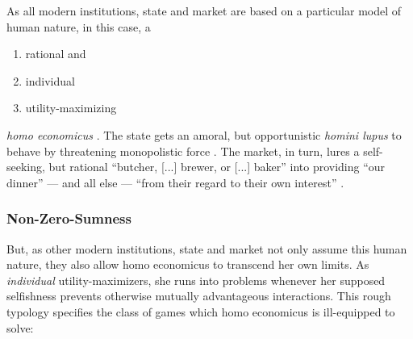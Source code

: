 As all modern institutions, state and market are based on a particular model of human nature, in this case, a
\begin{enumerate}
	\item rational and %
	\item individual
	\item utility-maximizing %
\end{enumerate}
\emph{homo economicus} \citep[maybe first in][]{Mill1848}.
The state gets an amoral, but opportunistic \emph{homini lupus} to behave by threatening monopolistic force \citep[as in][]{Hobbes-1651-aa}.
The market, in turn, lures a self-seeking, but rational ``butcher, [...] brewer, or [...] baker'' into providing ``our dinner'' --- and all else --- ``from their regard to their own interest'' \citep{Smith-1776-lq}.

\subsubsection[Nonzero]{Non-Zero-Sumness \label{sec:nonzero}}
But, as other modern institutions, state and market not only assume this human nature, they also allow homo economicus to transcend her own limits.
As \emph{individual} utility-maximizers, she runs into problems whenever her supposed selfishness prevents otherwise mutually advantageous interactions.
This rough typology specifies the class of games which homo economicus is ill-equipped to solve:

